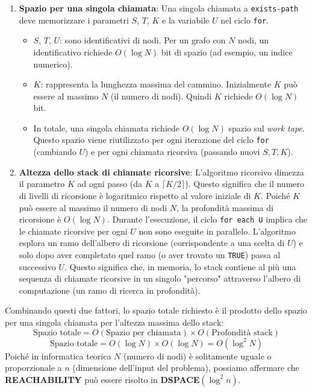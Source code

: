 \documentclass[a4paper]{article}
\theoremstyle{definition} %
\begin{document}
\begin{enumerate}
    \item \textbf{Spazio per una singola chiamata}:
        Una singola chiamata a \texttt{exists-path} deve memorizzare i parametri $S$, $T$, $K$ e la variabile $U$ nel ciclo \texttt{for}.
        \begin{itemize}
            \item $S$, $T$, $U$: sono identificativi di nodi. Per un grafo con $N$ nodi, un identificativo richiede $O(\log N)$ bit di spazio (ad esempio, un indice numerico).
            \item $K$: rappresenta la lunghezza massima del cammino. Inizialmente $K$ può essere al massimo $N$ (il numero di nodi). Quindi $K$ richiede $O(\log N)$ bit.
            \item In totale, una singola chiamata richiede $O(\log N)$ spazio sul \emph{work tape}. Questo spazio viene riutilizzato per ogni iterazione del ciclo \texttt{for} (cambiando $U$) e per ogni chiamata ricorsiva (passando nuovi $S, T, K$).
        \end{itemize}

    \item \textbf{Altezza dello stack di chiamate ricorsive}:
        L'algoritmo ricorsivo dimezza il parametro $K$ ad ogni passo (da $K$ a $\lceil K/2 \rceil$). Questo significa che il numero di livelli di ricorsione è logaritmico rispetto al valore iniziale di $K$. Poiché $K$ può essere al massimo il numero di nodi $N$, la profondità massima di ricorsione è $O(\log N)$.
        Durante l'esecuzione, il ciclo \texttt{for each U} implica che le chiamate ricorsive per ogni $U$ non sono eseguite in parallelo. L'algoritmo esplora un ramo dell'albero di ricorsione (corrispondente a una scelta di $U$) e solo dopo aver completato quel ramo (o aver trovato un \texttt{TRUE}) passa al successivo $U$. Questo significa che, in memoria, lo stack contiene al più una sequenza di chiamate ricorsive in un singolo "percorso" attraverso l'albero di computazione (un ramo di ricerca in profondità).
\end{enumerate}

Combinando questi due fattori, lo spazio totale richiesto è il prodotto dello spazio per una singola chiamata per l'altezza massima dello stack:
\[ \text{Spazio totale} = O(\text{Spazio per chiamata}) \times O(\text{Profondità stack}) \]
\[ \text{Spazio totale} = O(\log N) \times O(\log N) = O(\log^2 N) \]
Poiché in informatica teorica $N$ (numero di nodi) è solitamente uguale o proporzionale a $n$ (dimensione dell'input del problema), possiamo affermare che \textbf{REACHABILITY} può essere risolto in \textbf{DSPACE}$(\log^2 n)$.
\end{document}

